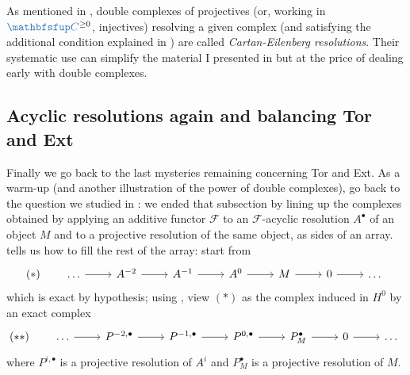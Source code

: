 As mentioned in , double complexes of projectives
(or, working in $\categ{C}^{\ge 0}$, injectives) resolving a given
complex (and satisfying the additional condition explained in
) are called \emph{Cartan-Eilenberg
  resolutions}. Their systematic use can simplify the material I
presented in
but at the price of dealing early with double complexes.

\subsection{Acyclic resolutions again and balancing Tor and Ext}
\label{subsec:homol:acyclic-resolutions-again-and-balancing-tor-and-ext}

Finally we go back to the last mysteries remaining concerning Tor and
Ext. As a warm-up (and another illustration of the power of double
complexes), go back to the question we studied in
: we ended that
subsection by lining up the complexes obtained by applying an additive
functor $\mathscr{F}$ to an $\mathscr{F}$-acyclic resolution
$A^\bullet$ of an object $M$ and to a projective resolution of the
same object, as sides of an array.   tells us how
to fill the rest of the array: start from
\[
  (*) \qquad
  \begin{tikzcd}
    \dots \arrow[r] & A^{-2} \arrow[r] & A^{-1} \arrow[r] & A^0
    \arrow[r] & M \arrow[r] & 0 \arrow[r] & \dots
  \end{tikzcd}
\]
which is exact by hypothesis; using , view $(*)$
as the complex induced in $H^0$ by an exact complex
\[
  (**) \qquad
  \begin{tikzcd}
    \dots \arrow[r] & P^{-2,\bullet} \arrow[r] & P^{-1,\bullet}
    \arrow[r] & P^{0,\bullet} \arrow[r] & P_M^\bullet \arrow[r] & 0
    \arrow[r] & \dots
  \end{tikzcd}
\]
where $P^{i,\bullet}$ is a projective resolution of $A^i$ and
$P_M^\bullet$ is a projective resolution of $M$.

